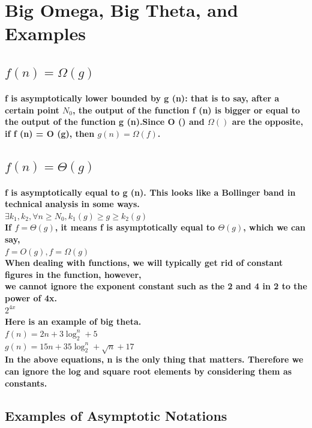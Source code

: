 \documentclass{article}
\begin{document}
\section{Big Omega, Big Theta, and Examples}

\subsection{$f(n)=\Omega(g)$}

\paragraph{f is asymptotically lower bounded by g (n): that is to say, after a certain point $N_0$, 
the output of the function f (n) is bigger or equal to the output of the function g (n).Since O () and $\Omega()$ are the opposite, if f (n) = O (g), then $g(n)=\Omega(f)$.}

\subsection{$f(n)=\Theta(g)$}

\paragraph{f is asymptotically equal to g (n). This looks like a Bollinger band in technical analysis in some ways.\\
$\exists k_1,k_2, \forall n \geq N_0,k_1(g) \geq g \geq k_2(g)$\\
If $f = \Theta(g)$, it means f is asymptotically equal to $\Theta(g)$, which we can say,\\
$f = O(g),  f = \Omega(g)$\\
When dealing with functions, we will typically get rid of constant figures in the function, however,\\
we cannot ignore the exponent constant such as the 2 and 4 in 2 to the power of 4x. \\
$2^{4x}$\\
Here is an example of big theta.\\
$f(n)=2n+3\log_2^n+5$\\
$g(n)=15n+35\log_2^n+\sqrt{n}+17$\\
In the above equations, n is the only thing that matters. Therefore we can ignore the log and square root elements by considering them as constants.}

\subsection{Examples of Asymptotic Notations}
\end{document}
